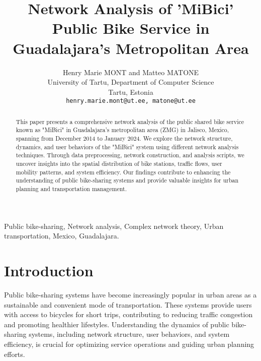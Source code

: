 \documentclass[conference]{IEEEtran}
\begin{document}
\title{\LARGE Network Analysis of 'MiBici' Public Bike Service in Guadalajara's Metropolitan Area}

\author{Henry Marie MONT and Matteo MATONE \\
University of Tartu, Department of Computer Science \\
Tartu, Estonia \\
\texttt{henry.marie.mont@ut.ee, matone@ut.ee}}

\maketitle

\begin{abstract}

This paper presents a comprehensive network analysis of the public shared bike service known as "MiBici" in Guadalajara's metropolitan area (ZMG) in Jalisco, Mexico, spanning from December 2014 to January 2024. We explore the network structure, dynamics, and user behaviors of the "MiBici" system using different network analysis techniques. Through data preprocessing, network construction, and analysis scripts, we uncover insights into the spatial distribution of bike stations, traffic flows, user mobility patterns, and system efficiency. Our findings contribute to enhancing the understanding of public bike-sharing systems and provide valuable insights for urban planning and transportation management.

\end{abstract}
\IEEEoverridecommandlockouts
\begin{keywords}
Public bike-sharing, Network analysis, Complex network theory, Urban transportation, Mexico, Guadalajara.
\end{keywords}

\section{Introduction}

Public bike-sharing systems have become increasingly popular in urban areas as a sustainable and convenient mode of transportation. These systems provide users with access to bicycles for short trips, contributing to reducing traffic congestion and promoting healthier lifestyles. Understanding the dynamics of public bike-sharing systems, including network structure, user behaviors, and system efficiency, is crucial for optimizing service operations and guiding urban planning efforts.
\end{document}
